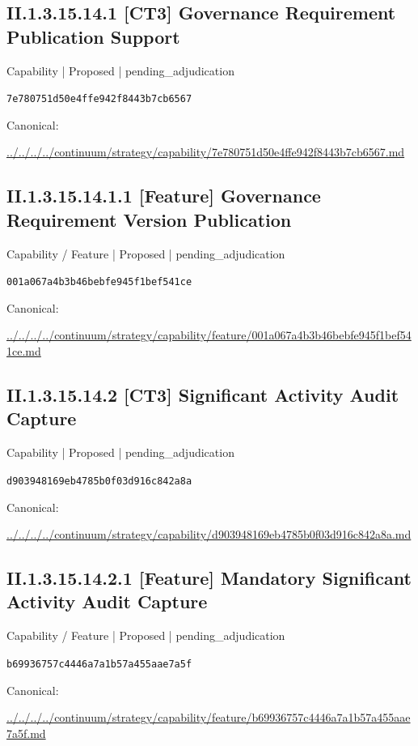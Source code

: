 \documentclass[10pt,a4paper]{article}
\begin{document}
\subsection*{II.1.3.15.14.1 [CT3] Governance Requirement Publication Support}
{\small Capability | Proposed | pending\_adjudication}\par
\texttt{7e780751d50e4ffe942f8443b7cb6567}\par
Canonical: \par
{\footnotesize\url{../../../../continuum/strategy/capability/7e780751d50e4ffe942f8443b7cb6567.md}}\par
\subsection*{II.1.3.15.14.1.1 [Feature] Governance Requirement Version Publication}
{\small Capability / Feature | Proposed | pending\_adjudication}\par
\texttt{001a067a4b3b46bebfe945f1bef541ce}\par
Canonical: \par
{\footnotesize\url{../../../../continuum/strategy/capability/feature/001a067a4b3b46bebfe945f1bef541ce.md}}\par
\subsection*{II.1.3.15.14.2 [CT3] Significant Activity Audit Capture}
{\small Capability | Proposed | pending\_adjudication}\par
\texttt{d903948169eb4785b0f03d916c842a8a}\par
Canonical: \par
{\footnotesize\url{../../../../continuum/strategy/capability/d903948169eb4785b0f03d916c842a8a.md}}\par
\subsection*{II.1.3.15.14.2.1 [Feature] Mandatory Significant Activity Audit Capture}
{\small Capability / Feature | Proposed | pending\_adjudication}\par
\texttt{b69936757c4446a7a1b57a455aae7a5f}\par
Canonical: \par
{\footnotesize\url{../../../../continuum/strategy/capability/feature/b69936757c4446a7a1b57a455aae7a5f.md}}\par
\end{document}
